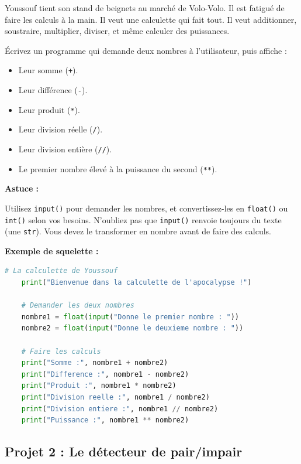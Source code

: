\documentclass[12pt,a4paper]{article}
\begin{document}
Youssouf tient son stand de beignets au marché de Volo-Volo. Il est fatigué de faire les calculs à la main. Il veut une calculette qui fait tout. Il veut additionner, soustraire, multiplier, diviser, et même calculer des puissances.

Écrivez un programme qui demande deux nombres à l'utilisateur, puis affiche :

\begin{itemize}
	\item [\ding{182}] Leur somme (\texttt{+}).
	\item [\ding{183}] Leur différence (\texttt{-}).
	\item [\ding{184}] Leur produit (\texttt{*}).
	\item [\ding{185}] Leur division réelle (\texttt{/}).
	\item [\ding{186}] Leur division entière (\texttt{//}).
	\item [\ding{187}] Le premier nombre élevé à la puissance du second (\texttt{**}).
\end{itemize}

\begin{flushleft}
	\textbf{Astuce :}
\end{flushleft}
Utilisez \texttt{input()} pour demander les nombres, et convertissez-les en \texttt{float()} ou \texttt{int()} selon vos besoins. N'oubliez pas que \texttt{input()} renvoie toujours du texte (une \texttt{str}). Vous devez le transformer en nombre avant de faire des calculs.

\textbf{Exemple de squelette :}

\begin{lstlisting}[language=Python]
	# La calculette de Youssouf
	print("Bienvenue dans la calculette de l'apocalypse !")
	
	# Demander les deux nombres
	nombre1 = float(input("Donne le premier nombre : "))
	nombre2 = float(input("Donne le deuxieme nombre : "))
	
	# Faire les calculs
	print("Somme :", nombre1 + nombre2)
	print("Difference :", nombre1 - nombre2)
	print("Produit :", nombre1 * nombre2)
	print("Division reelle :", nombre1 / nombre2)
	print("Division entiere :", nombre1 // nombre2)
	print("Puissance :", nombre1 ** nombre2)
\end{lstlisting}

\subsection*{Projet 2 : Le détecteur de pair/impair}
\end{document}
